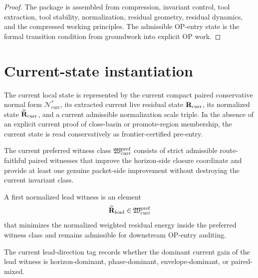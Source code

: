 \begin{proof}
The package is assembled from compression, invariant control, tool extraction, tool stability, normalization, residual geometry, residual dynamics, and the compressed working principles. The admissible OP-entry state is the formal transition condition from groundwork into explicit OP work.
\end{proof}

\section{Current-state instantiation}
\begin{definition}\label{def:current-frontier-preentry}
The current local state is represented by the current compact paired conservative normal form $\mathcal{N}^{\ast}_{\mathrm{curr}}$, its extracted current live residual state $\mathbf{R}_{\mathrm{curr}}$, its normalized state $\widetilde{\mathbf{R}}_{\mathrm{curr}}$, and a current admissible normalization scale triple. In the absence of an explicit current proof of close-basin or promote-region membership, the current state is read conservatively as frontier-certified pre-entry.
\end{definition}

\begin{definition}\label{def:preferred-witness-class}
The current preferred witness class $\mathfrak{W}^{\mathrm{pref}}_{\mathrm{curr}}$ consists of strict admissible route-faithful paired witnesses that improve the horizon-side closure coordinate and provide at least one genuine packet-side improvement without destroying the current invariant class.
\end{definition}

\begin{definition}\label{def:first-normalized-lead-witness}
A first normalized lead witness is an element
\[
\widetilde{\mathbf{R}}_{\mathrm{lead}}\in\mathfrak{W}^{\mathrm{pref}}_{\mathrm{curr}}
\]
that minimizes the normalized weighted residual energy inside the preferred witness class and remains admissible for downstream OP-entry auditing.
\end{definition}

\begin{definition}\label{def:lead-direction-tag}
The current lead-direction tag records whether the dominant current gain of the lead witness is horizon-dominant, phase-dominant, envelope-dominant, or paired-mixed.
\end{definition}

